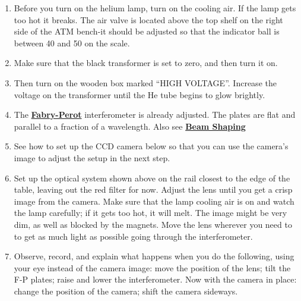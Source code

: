 \documentclass{../lab}
\begin{document}
\begin{enumerate}
    \item Before you turn on the helium lamp, turn on the cooling air. If the lamp gets too hot it breaks. The air valve is located above the top shelf on the right side of the ATM bench-it should be adjusted so that the indicator ball is between 40 and 50 on the scale.

    \item Make sure that the black transformer is set to zero, and then turn it on.

    \item Then turn on the wooden box marked ``HIGH VOLTAGE''. Increase the voltage on the transformer until the He tube begins to glow brightly.

    \item The \href{http://physics111.lib.berkeley.edu/Physics111/Reprints/ATM/OCR\%20Burleigh\%20tech\%20memo\%20fabry\%20perots.pdf}{\textbf{Fabry-Perot}} interferometer is already adjusted. The plates are flat and parallel to a fraction of a wavelength. Also see  \href{http://physics111.lib.berkeley.edu/Physics111/Reprints/ATM/Beam\%20Shaping.pdf}{\textbf{Beam Shaping}}

    \item See how to set up the CCD camera below so that you can use the camera's image to adjust the setup in the next step.

    \item Set up the optical system shown above on the rail closest to the edge of the table, leaving out the red filter for now. Adjust the lens until you get a crisp image from the camera. Make sure that the lamp cooling air is on and watch the lamp carefully; if it gets too hot, it will melt. The image might be very dim, as well as blocked by the magnets. Move the lens wherever you need to to get as much light as possible going through the interferometer.
    
    

    \item Observe, record, and explain what happens when you do the following, using your eye instead of the camera image: move the position of the lens; tilt the F-P plates; raise and lower the interferometer. Now with the camera in place: change the position of the camera; shift the camera sideways.


\end{enumerate}
\end{document}
